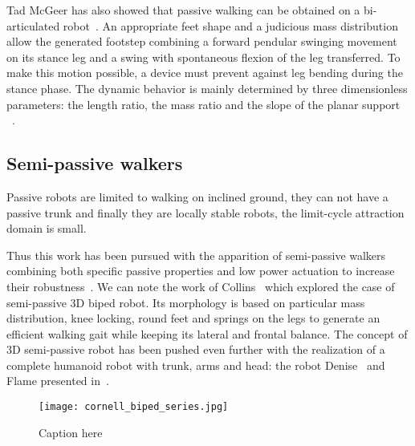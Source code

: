 \begin{figure}[]
\centering
    \hfil
    \caption{}
    \label{fig:mcgeer_work}
\end{figure}

Tad McGeer has also showed that passive walking can be obtained on a bi-articulated robot~\cite{mcgeer1992principles}. An appropriate feet shape and a judicious mass distribution allow the generated footstep combining a forward pendular swinging movement on its stance leg and a swing with spontaneous flexion of the leg transferred. To make this motion possible, a device must prevent against leg bending during the stance phase.
The dynamic behavior is mainly determined by three dimensionless parameters: the length ratio, the mass ratio and the slope of the planar support ~\cite{Garcia1998}.


\subsection{Semi-passive walkers} %
Passive robots are limited to walking on inclined ground, they can not have a passive trunk and finally they are locally stable robots, the limit-cycle attraction domain is small.

Thus this work has been pursued with the apparition of semi-passive walkers combining both specific passive properties and low power actuation to increase their robustness~\cite{Anderson2005}. We can note the work of Collins~\cite{collins2005bipedal} which explored the case of semi-passive 3D biped robot. Its morphology is based on particular mass distribution, knee locking, round feet and springs on the legs to generate an efficient walking gait while keeping its lateral and frontal balance. The concept of 3D semi-passive robot has been pushed even further with the realization of a complete humanoid robot with trunk, arms and head: the robot Denise~\cite{wisse2005three} and Flame presented in~\cite{Hobbelen2008}.

\begin{figure}[]
    \begin{center}
        \texttt{[image: cornell\_biped\_series.jpg]}
    \end{center}
    \caption{Caption here}
    \label{fig:figure1}
\end{figure}

